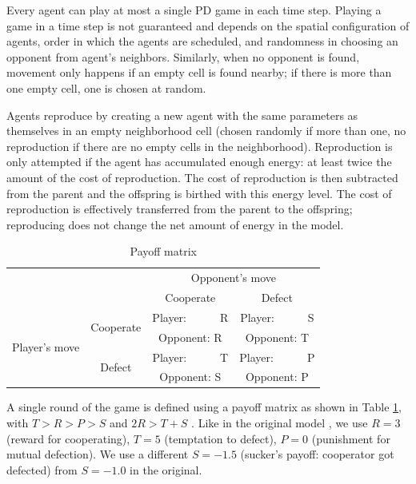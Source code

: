 \documentclass[english]{article}
\begin{document}
Every agent can play at most a single PD game in each time step.
Playing a game in a time step is not guaranteed and depends on the spatial configuration of agents, order in which the agents are scheduled, and randomness in choosing an opponent from agent's neighbors.
Similarly, when no opponent is found, movement only happens if an empty cell is found nearby; if there is more than one empty cell, one is chosen at random.

Agents reproduce by creating a new agent with the same parameters as themselves in an empty neighborhood cell (chosen randomly if more than one, no reproduction if there are no empty cells in the neighborhood).
Reproduction is only attempted if the agent has accumulated enough energy: at least twice the amount of the cost of reproduction.
The cost of reproduction is then subtracted from the parent and the offspring is birthed with this energy level.
The cost of reproduction is effectively transferred from the parent to the offspring;
reproducing does not change the net amount of energy in the model.

\begin{table}[h!]
  \centering
  \begin{tabular}{c c||c|c}
    & & \multicolumn{2}{c}{Opponent's move} \\
    & & Cooperate & Defect \\
    \hline\hline

    \multirow{4}{6em}{Player's move}
    & \multirow{2}{5em}{Cooperate}
      & Player:\ \ \ \ \ \ R & Player:\ \ \ \ \ \ S \\
    & & Opponent: R & Opponent: T \\
    \cline{2-4}
    & \multirow{2}{5em}{Defect}
      & Player:\ \ \ \ \ \ T & Player:\ \ \ \ \ \ P \\
    & & Opponent: S & Opponent: P \\
  \end{tabular}

  \caption{Payoff matrix}
  \label{table:payoff}
\end{table}

A single round of the game is defined using a payoff matrix as shown in Table \ref{table:payoff}, with $T > R > P > S$ and $2R > T + S$ \citep{chammah1965}.
Like in the original model \citep{smaldino},
we use $R = 3$ (reward for cooperating),
$T = 5$ (temptation to defect),
$P = 0$ (punishment for mutual defection).
We use a different $S = -1.5$ (sucker's payoff: cooperator got defected) from $S = -1.0$ in the original.
\end{document}
